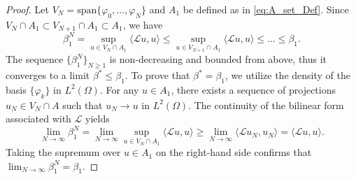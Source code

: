 \documentclass[11pt, a4paper]{article}
\theoremstyle{break}
\theoremstyle{break}
\theoremstyle{break}
\theoremstyle{break}
\theoremstyle{break}
\theoremstyle{break}
\theoremstyle{break}
\theoremstyle{break}
\theoremstyle{break}
\theoremstyle{break}
\begin{document}
\begin{proof}
    Let $V_N = \text{span}\{\varphi_0, \ldots, \varphi_N\}$ and $A_1$ be defined as in \eqref{eq:A_set_Def}. Since $V_N \cap A_1 \subset V_{N+1} \cap A_1 \subset A_1$, we have
    \begin{equation}
        \beta_1^N = \sup_{u \in V_N \cap A_1} \langle \mathcal{L} u, u \rangle \leq \sup_{u \in V_{N+1} \cap A_1} \langle \mathcal{L} u, u \rangle \leq \ldots \leq \beta_1.
    \end{equation}
    The sequence $\{\beta_1^N\}_{N \geq 1}$ is non-decreasing and bounded from above, thus it converges to a limit $\beta^* \leq \beta_1$. To prove that $\beta^* = \beta_1$, we utilize the density of the basis $\{\varphi_k\}$ in $L^2(\Omega)$. For any $u \in A_1$, there exists a sequence of projections $u_N \in V_N \cap A$ such that $u_N \to u$ in $L^2(\Omega)$. The continuity of the bilinear form associated with $\mathcal{L}$ yields
    \begin{equation}
        \lim_{N \to \infty} \beta_1^N = \lim_{N \to \infty} \sup_{u \in V_N \cap A_1} \langle \mathcal{L} u, u \rangle \geq \lim_{N \to \infty} \langle \mathcal{L} u_N, u_N \rangle = \langle \mathcal{L} u, u \rangle.
    \end{equation}
    Taking the supremum over $u \in A_1$ on the right-hand side confirms that $\lim_{N \to \infty} \beta_1^N = \beta_1$.
    

\end{proof}
\end{document}
